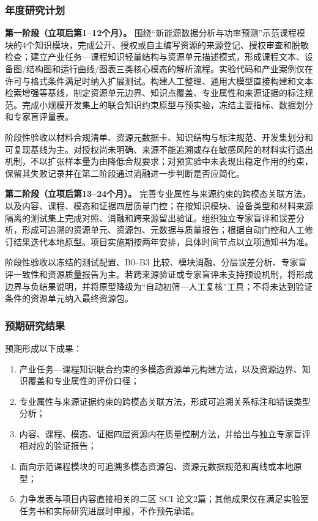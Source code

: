 \justifying
\NSFCBodyText

\subsubsection{年度研究计划}

\textbf{第一阶段（立项后第1--12个月）。} 围绕“新能源数据分析与功率预测”示范课程模块的4个知识模块，完成公开、授权或自主编写资源的来源登记、授权审查和脱敏检查；建立产业任务—课程知识轻量结构与资源单元描述模式，形成课程文本、设备图/结构图和运行曲线/图表三类核心模态的解析流程。实验代码和产业案例仅在许可与格式条件满足时纳入扩展测试。构建人工整理、通用大模型直接构建和文本检索增强等基线，制定资源单元边界、知识点覆盖、专业属性和来源证据的标注规范。完成小规模开发集上的联合知识约束原型与预实验，冻结主要指标、数据划分和专家盲评量表。

阶段性验收以材料合规清单、资源元数据卡、知识结构与标注规范、开发集划分和可复现基线为主。对授权尚未明确、来源不能追溯或存在敏感风险的材料实行退出机制，不以扩张样本量为由降低合规要求；对预实验中未表现出稳定作用的约束，保留其失败记录并在第二阶段通过消融进一步判断是否应简化。

\textbf{第二阶段（立项后第13--24个月）。} 完善专业属性与来源约束的跨模态关联方法，以及内容、课程、模态和证据四层质量门控；在按知识模块、设备类型和材料来源隔离的测试集上完成对照、消融和跨来源留出验证。组织独立专家盲评和误差分析，形成可追溯的资源单元、资源包、元数据与质量报告；根据自动门控和人工修订结果迭代本地原型。项目实施期按两年安排，具体时间节点以立项通知书为准。

阶段性验收以冻结的测试配置、B0--B3 比较、模块消融、分层误差分析、专家盲评一致性和资源质量报告为主。若跨来源验证或专家盲评未支持预设机制，将形成边界与负结果说明，并将原型降级为“自动初筛—人工复核”工具；不将未达到验证条件的资源单元纳入最终资源包。

\subsubsection{预期研究结果}

预期形成以下成果：

\begin{enumerate}
  \item 产业任务—课程知识联合约束的多模态资源单元构建方法，以及资源边界、知识覆盖和专业属性的评价口径；
  \item 专业属性与来源证据约束的跨模态关联方法，形成可追溯关系标注和错误类型分析；
  \item 内容、课程、模态、证据四层资源内在质量控制方法，并给出与独立专家盲评相对应的验证报告；
  \item 面向示范课程模块的可追溯多模态资源包、资源元数据规范和离线或本地原型；
  \item 力争发表与项目内容直接相关的二区 SCI 论文2篇；其他成果仅在满足实验室任务书和实际研究进展时申报，不作预先承诺。
\end{enumerate}


